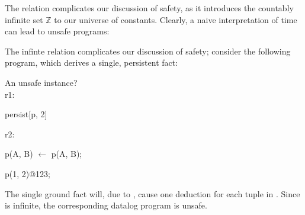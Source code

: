 The  relation complicates our discussion of safety, as it
introduces the countably infinite set $\mathbb{Z}$ to our
universe of constants.
Clearly, a naive interpretation of time can lead to unsafe programs:

The infinte  relation complicates our discussion of safety; consider the following \slang program, which derives a single, persistent fact:









\begin{example}
\label{ex:tempsafe}
%
An unsafe \slang instance?
\\
r1:
\begin{Dedalus}
persist[p, 2]
\end{Dedalus}
r2:
\begin{Dedalus}
p\pos(A, B)  \(\leftarrow\) p(A, B);
\end{Dedalus}
\begin{Dedalus}
p(1, 2)@123;
\end{Dedalus}


The single ground fact will, due to , cause one deduction for each
tuple in .  Since  is infinite, the corresponding datalog
program is unsafe.  
%
\end{example}

